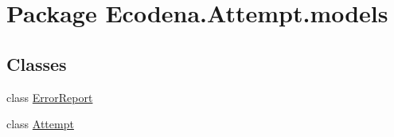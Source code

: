 \hypertarget{namespace_ecodena_1_1_attempt_1_1models}{
\section{Package Ecodena.Attempt.models}
\label{d1/dca/namespace_ecodena_1_1_attempt_1_1models}
}
\subsection*{Classes}
\begin{DoxyCompactItemize}
\item 
class \hyperlink{class_ecodena_1_1_attempt_1_1models_1_1_error_report}{ErrorReport}
\item 
class \hyperlink{class_ecodena_1_1_attempt_1_1models_1_1_attempt}{Attempt}
\end{DoxyCompactItemize}
